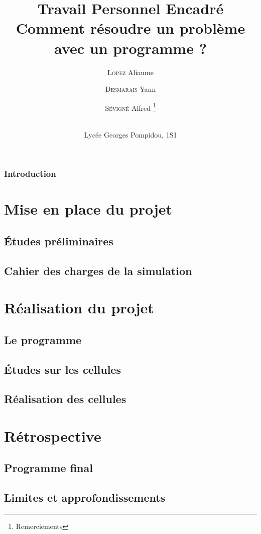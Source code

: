 \documentclass[a4paper,15pt]{report}
\title{
Travail Personnel Encadré \\
Comment résoudre un problème avec un programme ?
}
\author{
  \textsc{Lopez} Aliaume \and 
  \textsc{Desmarais} Yann \and 
  \textsc{Sévigné} Alfred
  \thanks{
     Remerciements
  } \and  \\
  Lycée Georges Pompidou, 1S1
}
\begin{document}
\maketitle

\section*{Introduction}
  
  
\tableofcontents

\part{Mise en place du projet}
  \chapter{Études préliminaires}
 	  
  \chapter{Cahier des charges de la simulation}
    
     
\part{Réalisation du projet}
  \chapter{Le programme}
    
  \chapter{Études sur les cellules}
		
  \chapter{Réalisation des cellules}
     
\part{Rétrospective}
  \chapter{Programme final}
    
  \chapter{Limites et approfondissements}
     
\end{document}
